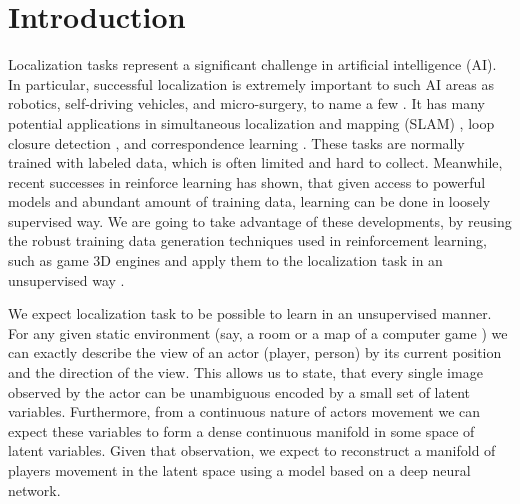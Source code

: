 
\chapter{Introduction}
\label{ch:intro}

%
%
%

Localization tasks represent a significant challenge in artificial intelligence (AI).
In particular, successful localization is extremely important to such AI areas as robotics, self-driving vehicles, and micro-surgery, to name a few \cite{Wang2017, Mountney2006}.
It has many potential applications in simultaneous localization and mapping (SLAM) \cite{Cadena2015, Zikos2016}, loop closure detection \cite{Xia2016, Gao2015a, Huang2016}, and correspondence learning \cite{Boscaini2016}.
These tasks are normally trained with labeled data, which is often limited and hard to collect.
Meanwhile, recent successes in reinforce learning \cite{Silver, Lample2016} has shown, that given access to powerful models and abundant amount of training data, learning can be done in loosely supervised way.
We are going to take advantage of these developments, by reusing the robust training data generation techniques used in reinforcement learning, such as game 3D engines \cite{Brockman2016, Kempka2016} and apply them to the localization task in an unsupervised way .

We expect localization task to be possible to learn in an unsupervised manner.
For any given static environment (say, a room or a map of a computer game ) we can exactly describe the view of an actor (player, person) by its current position and the direction of the view.
This allows us to state, that every single image observed by the actor can be unambiguous encoded by a small set of latent variables.
Furthermore, from a continuous nature of actors movement we can expect these variables to form a dense continuous manifold in some space of latent variables.
Given that observation, we expect to reconstruct a manifold of players movement in the latent space using a model based on a deep neural network.

